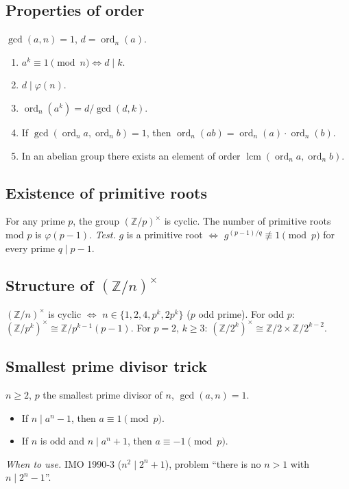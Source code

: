 \subsection{Properties of order}
\label{subsec:order-properties}

$\gcd(a,n)=1$, $d=\operatorname{ord}_n(a)$.
\begin{enumerate}
\item $a^k\equiv1\pmod n \iff d\mid k$.
\item $d\mid\varphi(n)$.
\item $\operatorname{ord}_n(a^k)=d/\gcd(d,k)$.
\item If $\gcd(\operatorname{ord}_n a,\operatorname{ord}_n b)=1$, then $\operatorname{ord}_n(ab)=\operatorname{ord}_n(a)\cdot\operatorname{ord}_n(b)$.
\item In an abelian group there exists an element of order $\operatorname{lcm}(\operatorname{ord}_n a,\operatorname{ord}_n b)$.
\end{enumerate}

\subsection{Existence of primitive roots}
\label{subsec:primitive-existence}

For any prime $p$, the group $(\mathbb{Z}/p)^\times$ is cyclic. The number of primitive roots mod $p$ is $\varphi(p-1)$.
\textit{Test.} $g$ is a primitive root $\iff$ $g^{(p-1)/q}\not\equiv1\pmod p$ for every prime $q\mid p-1$.

\subsection{Structure of $(\mathbb{Z}/n)^\times$}
\label{subsec:zn-structure}

$(\mathbb{Z}/n)^\times$ is cyclic $\iff$ $n\in\{1,2,4,p^k,2p^k\}$ ($p$ odd prime).
For odd $p$: $(\mathbb{Z}/p^k)^\times\cong\mathbb{Z}/p^{k-1}(p-1)$.
For $p=2$, $k\ge3$: $(\mathbb{Z}/2^k)^\times\cong\mathbb{Z}/2\times\mathbb{Z}/2^{k-2}$.

\subsection{Smallest prime divisor trick}
\label{subsec:smallest-prime}

$n\ge2$, $p$ the smallest prime divisor of $n$, $\gcd(a,n)=1$.
\begin{itemize}
\item If $n\mid a^n-1$, then $a\equiv1\pmod p$.
\item If $n$ is odd and $n\mid a^n+1$, then $a\equiv-1\pmod p$.
\end{itemize}
\textit{When to use.} IMO 1990{-}3 ($n^2\mid2^n+1$), problem ``there is no $n>1$ with $n\mid2^n-1$''.

